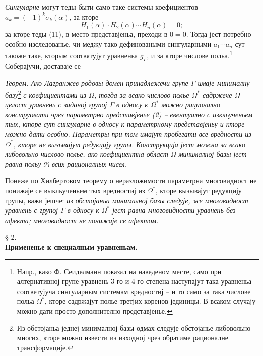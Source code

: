 ﻿\documentclass[11pt]{article}
\begin{document}
{\itshape Сингуларне} могут теды быти само таке системы коефициентов $a_k=(-1)^k\sigma_k(\alpha)$, за кторе
\[
H_1(\alpha)\cdot H_2(\alpha)\cdots H_n(\alpha)=0;
\]
за кторе теды (11), в место представјеньа, преходи в $0=0$. Тогда јест потребно особно изследованье, чи меджу тако дефиноваными сингуларными $a_1\cdots a_n$ сут такоже таке, кторым соотвятујут уравненьа $g_\Gamma$, и за кторе числове польа.\footnote{Напр., како Ф. Сеиделманн показал на наведеном месте, само при алтернативној групе уравнень 3-го и 4-го степена наступајут така уравненьа -- соответујуча сингуларным системам вредностиј -- и то само за така числове польа $\Omega^*$, кторе садржајут полье третјих коренов јединицы. В всаком случају можно дати просто дополнително представјенье.} Соберајучи, доставаје се

{\itshape Теорем. Ако Лагранжев родовы домен принадлежечи групе $\Gamma$ имаје минималну базу}\footnote{Из обстојаньа једнеј минималној базы одмах следује обстојанье либовольно многих, кторе можно извести из изходној чрез обратиме рационалне трансформације.} {\itshape с коефициентами из $\Omega$, тогда за всако числово полье $\Omega^*$ садржече $\Omega$ целост уравнень с заданој групој $\Gamma$ в односу к $\Omega^*$ можно рационално конструовати чрез параметрно представјенье (2) -- евентуално с изкльученьем тых, кторе сут сингуларне в односу к параметрному представјеньу и кторе можно дати особно. Параметры при том имајут пробегати все вредности из $\Omega^*$, кторе не вызывајут редукцију групы. Конструкција јест можна за всако либовольно числово полье, ако коефициентна област $\Omega$ минималној базы јест равна польу $\mathfrak R$ всих рационалных чисел.}

Понеже по Хилбертовом теорему о неразложимости параметрна многовидност не понижаје се выкльученьем тых вредностиј из $\Omega^*$, кторе вызывајут редукцију групы, важи јешче: {\itshape из обстојаньа минималној базы следује, же многовидност уравнень с групој $\Gamma$ в односу к $\Omega^*$ јест равна многовидности уравнень без афекта; многовидност не понижаје се афектом.}

\begin{center}
§ 2.\\[0.75\baselineskip]
\textbf{Примененье к специалным уравненьам.}
\end{center}
\end{document}
